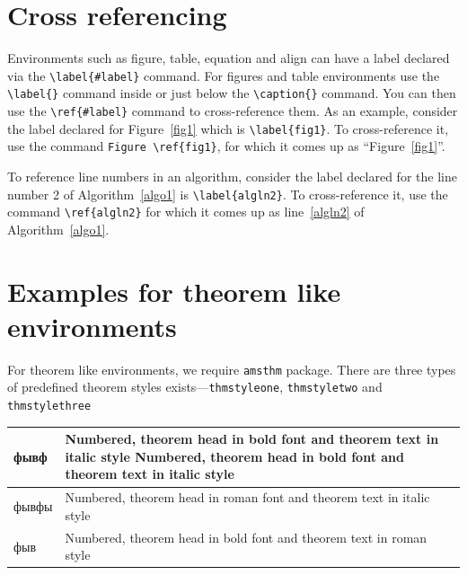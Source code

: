 \documentclass[pdflatex,sn-mathphys-num]{sn-jnl}%
\theoremstyle{thmstyleone}%
\theoremstyle{thmstyletwo}%
\theoremstyle{thmstylethree}%
\begin{document}
\section{Cross referencing}\label{sec8}

Environments such as figure, table, equation and align can have a label
declared via the \verb+\label{#label}+ command. For figures and table
environments use the \verb+\label{}+ command inside or just
below the \verb+\caption{}+ command. You can then use the
\verb+\ref{#label}+ command to cross-reference them. As an example, consider
the label declared for Figure~\ref{fig1} which is
\verb+\label{fig1}+. To cross-reference it, use the command 
\verb+Figure \ref{fig1}+, for which it comes up as
``Figure~\ref{fig1}''. 

To reference line numbers in an algorithm, consider the label declared for the line number 2 of Algorithm~\ref{algo1} is \verb+\label{algln2}+. To cross-reference it, use the command \verb+\ref{algln2}+ for which it comes up as line~\ref{algln2} of Algorithm~\ref{algo1}.

\section{Examples for theorem like environments}\label{sec10}

For theorem like environments, we require \verb+amsthm+ package. There are three types of predefined theorem styles exists---\verb+thmstyleone+, \verb+thmstyletwo+ and \verb+thmstylethree+ 

\bigskip
\begin{tabular}{|l|p{19pc}|}
\hline
фывф & Numbered, theorem head in bold font and theorem text in italic style Numbered, theorem head in bold font and theorem text in italic style  \\\hline
фывфы & Numbered, theorem head in roman font and theorem text in italic style \\\hline
фыв& Numbered, theorem head in bold font and theorem text in roman style \\\hline
\end{tabular}
\bigskip
\end{document}

